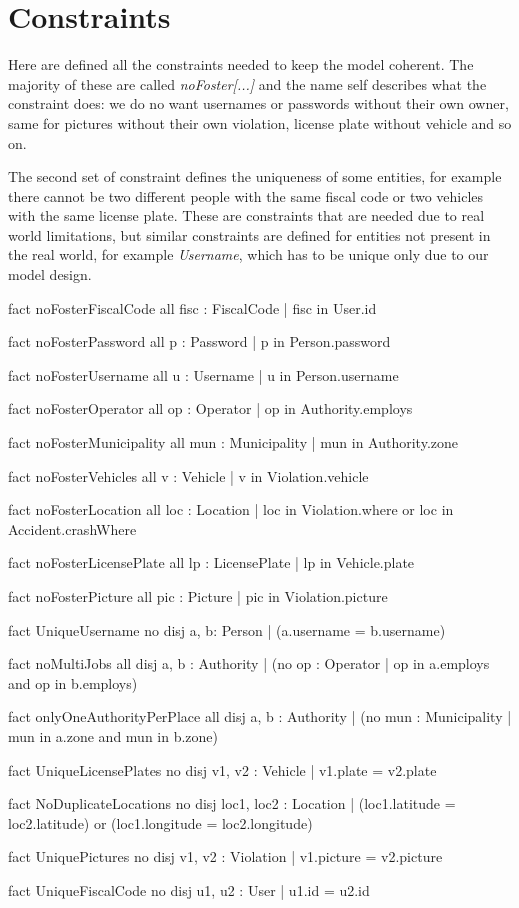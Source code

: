 \section{Constraints}
Here are defined all the constraints needed to keep the model coherent. The
majority of these are called \emph{noFoster[...]} and the name self describes
what the constraint does: we do no want usernames or passwords without their own
owner, same for pictures without their own violation, license plate without vehicle
and so on.

The second set of constraint defines the uniqueness of some entities, for
example there cannot be two different people with the same fiscal code or two
vehicles with the same license plate. These are constraints that are needed due
to real world limitations, but similar constraints are defined for entities not
present in the real world, for example \emph{Username}, which has to be unique
only due to our model design.

\begin{alloy}
    fact noFosterFiscalCode {
        all fisc : FiscalCode | fisc in User.id
    }

    fact noFosterPassword {
        all p : Password | p in Person.password
    }

    fact noFosterUsername {
        all u : Username | u in Person.username
    }

    fact noFosterOperator {
        all op : Operator | op in Authority.employs
    }

    fact noFosterMunicipality {
        all mun : Municipality | mun in Authority.zone
    }

    fact noFosterVehicles {
        all v : Vehicle | v in Violation.vehicle
    }

    fact noFosterLocation {
        all loc : Location | loc in Violation.where or loc in Accident.crashWhere
    }

    fact noFosterLicensePlate{
        all lp : LicensePlate | lp in Vehicle.plate
    }

    fact noFosterPicture{
        all pic : Picture | pic in Violation.picture
    }

    fact UniqueUsername {
        no disj a, b: Person | (a.username = b.username)
    } 

    fact noMultiJobs {
        all disj a, b : Authority | (no op : Operator | 
            op in a.employs and op in b.employs)
    }

    fact onlyOneAuthorityPerPlace {
        all disj a, b : Authority | (no mun : Municipality | 
            mun in a.zone and mun in b.zone)
    }

    fact UniqueLicensePlates {
        no disj v1, v2 : Vehicle | v1.plate = v2.plate
    }

    fact NoDuplicateLocations {
        no disj loc1, loc2 : Location | (loc1.latitude = loc2.latitude) or 
            (loc1.longitude = loc2.longitude)
    }

    fact UniquePictures {
        no disj v1, v2 : Violation | v1.picture = v2.picture
    }

    fact UniqueFiscalCode{
        no disj u1, u2 : User | u1.id = u2.id
    }
\end{alloy}